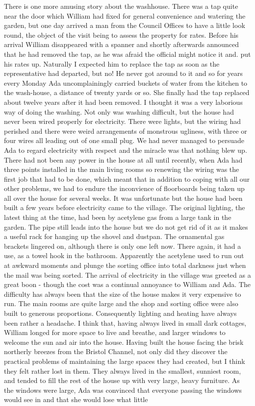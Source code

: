 There is one more amusing story about the washhouse. There was a tap quite near the door which William had fixed for general convenience and watering the garden, but one day arrived a man from the Council Offices to have a little look round, the object of the visit being to assess the property for rates. Before his arrival William disappeared  with a spanner and shortly afterwards announced that he had removed the tap, as he was afraid the official might notice it and. put his rates up. Naturally I expected him to replace the tap as soon as the representative had departed, but no! He never got around to it and so for years every Monday Ada uncomplainingly carried buckets of water from the kitchen to the wash-house, a distance of twenty yards or so. She finally had the tap replaced about twelve years after it had been removed. I thought it was a very laborious way of doing the washing. Not only was washing difficult, but the house had never been wired properly for electricity. There were lights, but the wiring had perished and there were weird arrangements of monstrous ugliness, with three or four wires all leading out of one small plug. We had never managed to persuade Ada to regard electricity with respect and the miracle was that nothing blew up. There had not been any power in the house at all until recently, when Ada had three points installed in the main living rooms so renewing the wiring was the first job that had to be done, which meant that in addition to coping with all our other problems, we had to endure the inconvience of floorboards being taken up all over the house for several weeks. It was unfortunate but the house had been built a few years before electricity came to the village. The original lighting, the latest thing at the time, had been by acetylene gas from a large tank in the garden. The pipe still leads into the house but we do not get rid of it as it makes a useful rack for hanging up the shovel and dustpan. The ornamental gas brackets lingered on, although there is only one left now. There again, it had a use, as a towel hook in the bathroom. Apparently the acetylene used to run out at awkward moments and plunge the sorting office into total darkness just when the mail was being sorted. The arrival of electricity in the village was greeted as a great boon - though the cost was a continual annoyance to William and Ada. The difficulty has always been that the size of the house makes it very expensive to run. The main rooms are quite large and the shop and sorting office were also built to generous proportions. Consequently lighting and heating have always been rather a headache. I think that, having always lived in small dark cottages, William longed for more space to live and breathe, and larger windows to welcome the sun and air into the house. Having built the house facing the brisk northerly breezes from the Bristol Channel, not only did they discover the practical problems of maintaining the large spaces they had created, but I think they felt rather lost in them. They always lived in the smallest, sunniest room, and tended to fill the rest of the house up with very large, heavy furniture. As the windows were large, Ada was convinced that everyone passing the windows would see in and that she would lose what little 